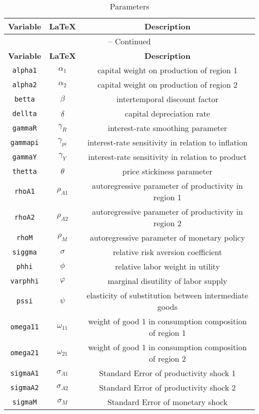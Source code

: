 \begin{center}
\begin{longtable}{ccc}
\caption{Parameters}\\%
\hline%
\multicolumn{1}{c}{\textbf{Variable}} &
\multicolumn{1}{c}{\textbf{\LaTeX}} &
\multicolumn{1}{c}{\textbf{Description}}\\%
\hline\hline%
\endfirsthead
\multicolumn{3}{c}{{\tablename} \thetable{} -- Continued}\\%
\hline%
\multicolumn{1}{c}{\textbf{Variable}} &
\multicolumn{1}{c}{\textbf{\LaTeX}} &
\multicolumn{1}{c}{\textbf{Description}}\\%
\hline\hline%
\endhead
\texttt{alpha1} & ${\alpha_{1}}$ & capital weight on production of region 1\\
\texttt{alpha2} & ${\alpha_{2}}$ & capital weight on production of region 2\\
\texttt{betta} & ${\beta}$ & intertemporal discount factor\\
\texttt{dellta} & ${\delta}$ & capital depreciation rate\\
\texttt{gammaR} & ${\gamma_{R}}$ & interest-rate smoothing parameter\\
\texttt{gammapi} & ${\gamma_{pi}}$ & interest-rate sensitivity in relation to inflation\\
\texttt{gammaY} & ${\gamma_{Y}}$ & interest-rate sensitivity in relation to product\\
\texttt{thetta} & ${\theta}$ & price stickiness parameter\\
\texttt{rhoA1} & ${\rho_{A1}}$ & autoregressive parameter of productivity in region 1\\
\texttt{rhoA2} & ${\rho_{A2}}$ & autoregressive parameter of productivity in region 2\\
\texttt{rhoM} & ${\rho_{M}}$ & autoregressive parameter of monetary policy\\
\texttt{siggma} & ${\sigma}$ & relative risk aversion coefficient\\
\texttt{phhi} & ${\phi}$ & relative labor weight in utility\\
\texttt{varphhi} & ${\varphi}$ & marginal disutility of labor supply\\
\texttt{pssi} & ${\psi}$ & elasticity of substitution between intermediate goods\\
\texttt{omega11} & ${\omega_{11}}$ & weight of good 1 in consumption composition of region 1\\
\texttt{omega21} & ${\omega_{21}}$ & weight of good 1 in consumption composition of region 2\\
\texttt{sigmaA1} & ${\sigma_{A1}}$ & Standard Error of productivity shock 1\\
\texttt{sigmaA2} & ${\sigma_{A2}}$ & Standard Error of productivity shock 2\\
\texttt{sigmaM} & ${\sigma_M}$ & Standard Error of monetary shock\\
\hline%
\end{longtable}
\end{center}
